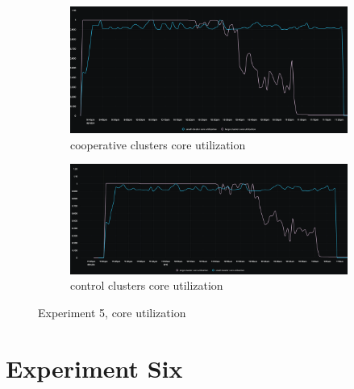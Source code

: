 \begin{figure}[H]
\centering
\begin{subfigure}{.5\textwidth}
  \centering
  \includegraphics[width=.9\linewidth]{./figures/experiment-five/alibaba-core-coop.png}
  \caption{cooperative clusters core utilization}
  \label{fig:exp5coopcore}
\end{subfigure}%
\begin{subfigure}{.5\textwidth}
  \centering
  \includegraphics[width=.9\linewidth]{./figures/experiment-five/alibaba-core-control.png}
  \caption{control clusters core utilization}
  \label{fig:exp5controlcore}
\end{subfigure}
\caption{Experiment 5, core utilization}
\label{fig:exp5coreutil}
\end{figure}

\section{Experiment Six}

